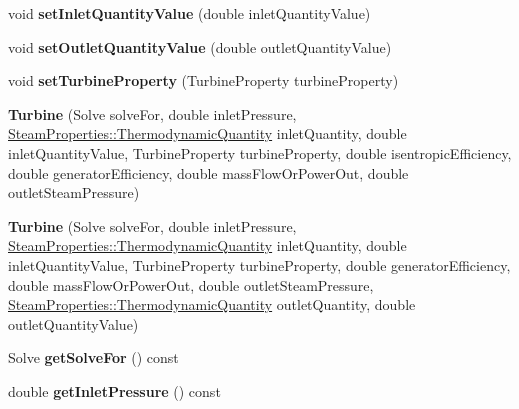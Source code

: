 \begin{DoxyCompactItemize}
\item 
\mbox{\label{class_turbine_ac01a053462c83e21ecc2158e75477542}} 
void {\bfseries set\+Inlet\+Quantity\+Value} (double inlet\+Quantity\+Value)
\item 
\mbox{\label{class_turbine_ab37326068f633280de8f8144b9c8eb89}} 
void {\bfseries set\+Outlet\+Quantity\+Value} (double outlet\+Quantity\+Value)
\item 
\mbox{\label{class_turbine_abb3f16cefe52f4e9c7b32b2bb17a68ee}} 
void {\bfseries set\+Turbine\+Property} (Turbine\+Property turbine\+Property)
\item 
\mbox{\label{class_turbine_a3c3c871b9fe57d48dd06b109794381dc}} 
{\bfseries Turbine} (Solve solve\+For, double inlet\+Pressure, \hyperlink{class_steam_properties_ae0294bedf7d178c2d8fb6aed0f62fbff}{Steam\+Properties\+::\+Thermodynamic\+Quantity} inlet\+Quantity, double inlet\+Quantity\+Value, Turbine\+Property turbine\+Property, double isentropic\+Efficiency, double generator\+Efficiency, double mass\+Flow\+Or\+Power\+Out, double outlet\+Steam\+Pressure)
\item 
\mbox{\label{class_turbine_a1ec182906c075407882de542954d9030}} 
{\bfseries Turbine} (Solve solve\+For, double inlet\+Pressure, \hyperlink{class_steam_properties_ae0294bedf7d178c2d8fb6aed0f62fbff}{Steam\+Properties\+::\+Thermodynamic\+Quantity} inlet\+Quantity, double inlet\+Quantity\+Value, Turbine\+Property turbine\+Property, double generator\+Efficiency, double mass\+Flow\+Or\+Power\+Out, double outlet\+Steam\+Pressure, \hyperlink{class_steam_properties_ae0294bedf7d178c2d8fb6aed0f62fbff}{Steam\+Properties\+::\+Thermodynamic\+Quantity} outlet\+Quantity, double outlet\+Quantity\+Value)
\item 
\mbox{\label{class_turbine_a58c73057a4b890eab2af2b42c82484e6}} 
Solve {\bfseries get\+Solve\+For} () const
\item 
\mbox{\label{class_turbine_a148ad3877851f1c3931d8a6771d750c5}} 
double {\bfseries get\+Inlet\+Pressure} () const
\item 
\mbox{\label{class_turbine_a5d907859de4acc153a32bd443238b445}} 

\end{DoxyCompactItemize}
